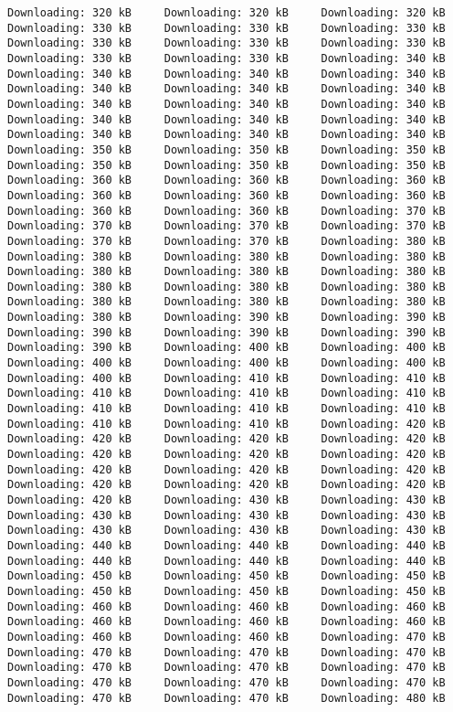 \documentclass[
  12pt,
]{report}
\begin{document}
\begin{verbatim}
Downloading: 320 kB     Downloading: 320 kB     Downloading: 320 kB     Downloading: 330 kB     Downloading: 330 kB     Downloading: 330 kB     Downloading: 330 kB     Downloading: 330 kB     Downloading: 330 kB     Downloading: 330 kB     Downloading: 330 kB     Downloading: 340 kB     Downloading: 340 kB     Downloading: 340 kB     Downloading: 340 kB     Downloading: 340 kB     Downloading: 340 kB     Downloading: 340 kB     Downloading: 340 kB     Downloading: 340 kB     Downloading: 340 kB     Downloading: 340 kB     Downloading: 340 kB     Downloading: 340 kB     Downloading: 340 kB     Downloading: 340 kB     Downloading: 340 kB     Downloading: 350 kB     Downloading: 350 kB     Downloading: 350 kB     Downloading: 350 kB     Downloading: 350 kB     Downloading: 350 kB     Downloading: 360 kB     Downloading: 360 kB     Downloading: 360 kB     Downloading: 360 kB     Downloading: 360 kB     Downloading: 360 kB     Downloading: 360 kB     Downloading: 360 kB     Downloading: 370 kB     Downloading: 370 kB     Downloading: 370 kB     Downloading: 370 kB     Downloading: 370 kB     Downloading: 370 kB     Downloading: 380 kB     Downloading: 380 kB     Downloading: 380 kB     Downloading: 380 kB     Downloading: 380 kB     Downloading: 380 kB     Downloading: 380 kB     Downloading: 380 kB     Downloading: 380 kB     Downloading: 380 kB     Downloading: 380 kB     Downloading: 380 kB     Downloading: 380 kB     Downloading: 380 kB     Downloading: 390 kB     Downloading: 390 kB     Downloading: 390 kB     Downloading: 390 kB     Downloading: 390 kB     Downloading: 390 kB     Downloading: 400 kB     Downloading: 400 kB     Downloading: 400 kB     Downloading: 400 kB     Downloading: 400 kB     Downloading: 400 kB     Downloading: 410 kB     Downloading: 410 kB     Downloading: 410 kB     Downloading: 410 kB     Downloading: 410 kB     Downloading: 410 kB     Downloading: 410 kB     Downloading: 410 kB     Downloading: 410 kB     Downloading: 410 kB     Downloading: 420 kB     Downloading: 420 kB     Downloading: 420 kB     Downloading: 420 kB     Downloading: 420 kB     Downloading: 420 kB     Downloading: 420 kB     Downloading: 420 kB     Downloading: 420 kB     Downloading: 420 kB     Downloading: 420 kB     Downloading: 420 kB     Downloading: 420 kB     Downloading: 420 kB     Downloading: 430 kB     Downloading: 430 kB     Downloading: 430 kB     Downloading: 430 kB     Downloading: 430 kB     Downloading: 430 kB     Downloading: 430 kB     Downloading: 430 kB     Downloading: 440 kB     Downloading: 440 kB     Downloading: 440 kB     Downloading: 440 kB     Downloading: 440 kB     Downloading: 440 kB     Downloading: 450 kB     Downloading: 450 kB     Downloading: 450 kB     Downloading: 450 kB     Downloading: 450 kB     Downloading: 450 kB     Downloading: 460 kB     Downloading: 460 kB     Downloading: 460 kB     Downloading: 460 kB     Downloading: 460 kB     Downloading: 460 kB     Downloading: 460 kB     Downloading: 460 kB     Downloading: 470 kB     Downloading: 470 kB     Downloading: 470 kB     Downloading: 470 kB     Downloading: 470 kB     Downloading: 470 kB     Downloading: 470 kB     Downloading: 470 kB     Downloading: 470 kB     Downloading: 470 kB     Downloading: 470 kB     Downloading: 470 kB     Downloading: 480 kB     
\end{verbatim}
\end{document}
